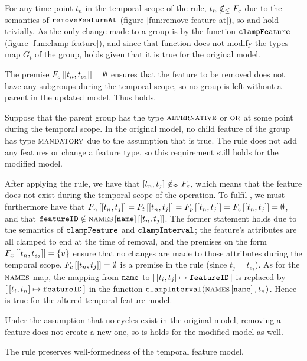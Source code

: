 For any time point $t_n$ in the temporal scope of the rule, $t_n \notin_\leq F_e$ due to the semantics of $\texttt{removeFeatureAt}$ (figure \vref{fun:remove-feature-at}), so  and  hold trivially. As the only change made to a group is by the function $\texttt{clampFeature}$ (figure \vref{fun:clamp-feature}), and since that function does not modify the types map $G_t$ of the group,  holds given that it is true for the original model. 

The premise $\lookup{F_c}{\interval{t_n}{t_{e_2}}} = \emptyset$ ensures that the feature to be removed does not have any subgroups during the temporal scope, so no group is left without a parent in the updated model. Thus  holds. 

Suppose that the parent group has the type $\textsc{alternative}{}$ or $\textsc{or}{}$ at some point during the temporal scope. In the original model, no child feature of the group has type $\textsc{mandatory}{}$ due to the assumption that  is true. The  rule does not add any features or change a feature type, so this requirement still holds for the modified model. 

After applying the rule, we have that $\interval{t_n}{t_j} \notinnr F_e$, which means that the feature does not exist during the temporal scope of the operation. To fulfil , we must furthermore have that $\lookup{F_n}{\interval{t_n}{t_j}} = \lookup{F_t}{\interval{t_n}{t_j}}= \lookup{F_p}{\interval{t_n}{t_j}} = \lookup{F_c}{\interval{t_n}{t_j}} = \emptyset$, and that $\var{featureID} \notin \lookup{\lookup{\names}{\var{name}}}{\interval{t_n}{t_j}}$. The former statement holds due to the semantics of $\texttt{clampFeature}$ and $\texttt{clampInterval}$; the feature's attributes are all clamped to end at the time of removal, and the premises on the form $\lookup{F_x}{\interval{t_n}{t_{e_2}}} = \set{v}$ ensure that no changes are made to those attributes during the temporal scope. $\lookup{F_c}{\interval{t_n}{t_j}} = \emptyset$ is a premise in the rule (since $t_j = t_{e_2}$). As for the $\textsc{names}$ map, the mapping from $\texttt{name}$ to $\intervalmapping{t_i}{t_j}{\var{featureID}}$ is replaced by $\intervalmapping{t_i}{t_n}{\var{featureID}}$ in the function $\texttt{clampInterval}(\textsc{names} \left[ \texttt{name} \right], t_n)$. Hence  is true for the altered temporal feature model.

Under the assumption that no cycles exist in the original model, removing a feature does not create a new one, so  is holds for the modified model as well.
\\

\begin{lemma}
   The  rule preserves well-formedness of the temporal feature model. 
   \label{lemma:remove-feature-well-formed}
\end{lemma}

